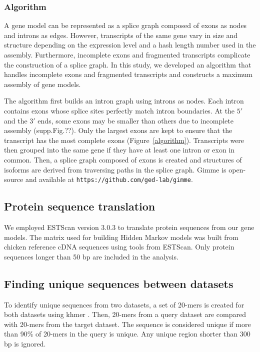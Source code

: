 \documentclass[10pt]{article}
\begin{document}
\subsubsection*{Algorithm}

A gene model can be represented as a splice graph composed of exons as nodes and
introns as edges.  However, transcripts of the same gene vary in size and
structure depending on the expression level and a hash length number used in
the assembly.  Furthermore, incomplete exons and fragmented transcripts complicate
the construction of a splice graph.  In this study, we developed an algorithm
that handles incomplete exons and fragmented transcripts and constructs a
maximum assembly of gene models.

The algorithm first builds an intron graph using introns as nodes.  Each intron
contains exons whose splice sites perfectly match intron boundaries. At the
$5\prime$ and the $3\prime$ ends, some exons may be smaller than others due to
incomplete assembly (supp.Fig.??). Only the largest exons are kept to ensure
that the transcript has the most complete exons (Figure~\ref{algorithm}).
Transcripts were then grouped into the same gene if they have at least one
intron or exon in common.  Then, a splice graph composed of exons is created
and structures of isoforms are derived from traversing paths in the splice
graph.  Gimme is open-source and available at
\texttt{https://github.com/ged-lab/gimme}.

\subsection*{Protein sequence translation}

We employed ESTScan version 3.0.3 to translate protein sequences from our gene
models.  The matrix used for building Hidden Markov models was built from chicken
reference cDNA sequences using tools from ESTScan. Only protein sequences longer
than 50 bp are included in the analysis.

\subsection*{Finding unique sequences between datasets}

To identify unique sequences from two datasets, a set of 20-mers is created for
both datasets using khmer\cite{} . Then, 20-mers from a query dataset are
compared with 20-mers from the target dataset.  The sequence is considered
unique if more than 90\% of 20-mers in the query is unique.  Any unique region
shorter than 300 bp is ignored.
\end{document}
